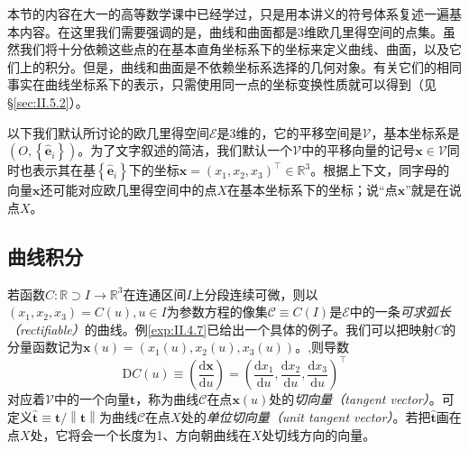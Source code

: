 \documentclass[../main.tex]{subfiles}
\begin{document}
本节的内容在大一的高等数学课中已经学过\cite[\S 9]{华工高数2009下}，只是用本讲义的符号体系复述一遍基本内容。在这里我们需要强调的是，曲线和曲面都是3维欧几里得空间的点集。虽然我们将十分依赖这些点的在基本直角坐标系下的坐标来定义曲线、曲面，以及它们上的积分。但是，曲线和曲面是不依赖坐标系选择的几何对象。有关它们的相同事实在曲线坐标系下的表示，只需使用同一点的坐标变换性质就可以得到（见\S\ref{sec:II.5.2}）。

以下我们默认所讨论的欧几里得空间$\mathcal{E}$是3维的，它的平移空间是$\mathcal{V}$，基本坐标系是$\left(O,\left\{\mathbf{\hat{e}}_i\right\}\right)$。为了文字叙述的简洁，我们默认一个$\mathcal{V}$中的平移向量的记号$\mathbf{x}\in\mathcal{V}$同时也表示其在基$\left\{\mathbf{\hat{e}}_i\right\}$下的坐标$\mathbf{x}=\left(x_1,x_2,x_3\right)^\intercal\in\mathbb{R}^3$。根据上下文，同字母的向量$\mathbf{x}$还可能对应欧几里得空间中的点$X$在基本坐标系下的坐标；说“点$\mathbf{x}$”就是在说点$X$。

\subsection{曲线积分}
若函数$C:\mathbb{R}\supset I\rightarrow\mathbb{R}^3$在连通区间$I$上分段连续可微，则以$\left(x_1,x_2,x_3\right)=C\left(u\right),u\in I$为参数方程的像集$\mathcal{C}\equiv C\left(I\right)$是$\mathcal{E}$中的一条\emph{可求弧长（rectifiable）}的曲线。例\ref{exp:II.4.7}已给出一个具体的例子。我们可以把映射$C$的分量函数记为$\mathbf{x}\left(u\right)=\left(x_1\left(u\right),x_2\left(u\right),x_3\left(u\right)\right)$。,则导数
\[
    \mathrm{D}C\left(u\right)\equiv\left(\frac{\mathrm{d}\mathbf{x}}{\mathrm{d}u}\right)=\left(\frac{\mathrm{d}x_1}{\mathrm{d}u},\frac{\mathrm{d}x_2}{\mathrm{d}u},\frac{\mathrm{d}x_3}{\mathrm{d}u}\right)^\intercal
\]
对应着$\mathcal{V}$中的一个向量$\mathbf{t}$，称为曲线$\mathcal{C}$在点$\mathbf{x}\left(u\right)$处的\emph{切向量（tangent vector）}。可定义$\mathbf{\hat{t}}\equiv\mathbf{t}/\left\|\mathbf{t}\right\|$为曲线$\mathcal{C}$在点$X$处的\emph{单位切向量（unit tangent vector）}。若把$\mathbf{\hat{t}}$画在点$X$处，它将会一个长度为1、方向朝曲线在$X$处切线方向的向量。
\end{document}
